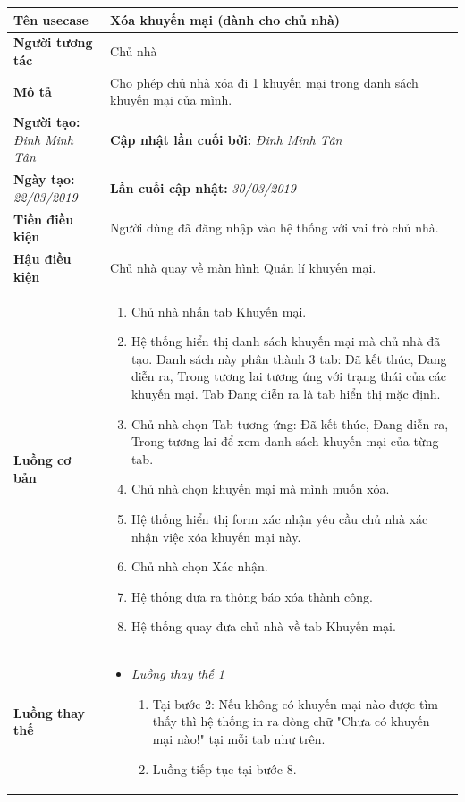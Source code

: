 \begin{center}
	\begin{longtable}{ | l |p{10cm}|}
		\hline
		\textbf{Tên usecase} & Xóa khuyến mại (dành cho chủ nhà) \\ \hline
		\textbf{Người tương tác} & Chủ nhà \\ \hline   
		\textbf{Mô tả} & Cho phép chủ nhà xóa đi 1 khuyến mại trong danh sách khuyến mại của mình. \\ \hline  
		\textbf{Người tạo:} \textit{Đinh Minh Tân} & \textbf{Cập nhật lần cuối bởi:} \textit{Đinh Minh Tân} \\ \hline
		\textbf{Ngày tạo:} \textit{22/03/2019} & \textbf{Lần cuối cập nhật:} \textit{30/03/2019} \\ \hline
		\textbf{Tiền điều kiện} & Người dùng đã đăng nhập vào hệ thống với vai trò chủ nhà.  \\ \hline 
		\textbf{Hậu điều kiện} & Chủ nhà quay về màn hình Quản lí khuyến mại. \\ \hline 
		\textbf{Luồng cơ bản} & 
		\begin{enumerate}
			\item Chủ nhà nhấn tab Khuyến mại.
			\item Hệ thống hiển thị danh sách khuyến mại mà chủ nhà đã tạo. Danh sách này phân thành 3 tab: Đã kết thúc, Đang diễn ra, Trong tương lai tương ứng với trạng thái của các khuyến mại. Tab Đang diễn ra là tab hiển thị mặc định.
			\item Chủ nhà chọn Tab tương ứng: Đã kết thúc, Đang diễn ra, Trong tương lai để xem danh sách khuyến mại của từng tab.
			\item Chủ nhà chọn khuyến mại mà mình muốn xóa.
			\item Hệ thống hiển thị form xác nhận yêu cầu chủ nhà xác nhận việc xóa khuyến mại này. 
			\item Chủ nhà chọn Xác nhận.
			\item Hệ thống đưa ra thông báo xóa thành công.
			\item Hệ thống quay đưa chủ nhà về tab Khuyến mại.
		\end{enumerate} \\ \hline 
		\textbf{Luồng thay thế} & 
		\begin{itemize} 
			\item \textit{Luồng thay thế 1}
			\begin{enumerate}
				\item Tại bước 2: Nếu không có khuyến mại nào được tìm thấy thì hệ thống in ra dòng chữ "Chưa có khuyến mại nào!" tại mỗi tab như trên.
				\item Luồng tiếp tục tại bước 8. 
			\end{enumerate}
			

\end{itemize}
\end{longtable}
\end{center}
